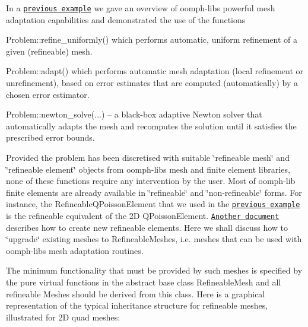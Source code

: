In a \href{../../../poisson/fish_poisson/html/index.html}{\tt previous example} we gave an overview of {\ttfamily oomph-\/lib\textquotesingle{}s} powerful mesh adaptation capabilities and demonstrated the use of the functions
\begin{DoxyItemize}
\item {\ttfamily Problem\+::refine\+\_\+uniformly()} which performs automatic, uniform refinement of a given (refineable) mesh.
\item {\ttfamily Problem\+::adapt()} which performs automatic mesh adaptation (local refinement or unrefinement), based on error estimates that are computed (automatically) by a chosen error estimator.
\item {\ttfamily Problem\+::newton\+\_\+solve}(...) -- a black-\/box adaptive Newton solver that automatically adapts the mesh and recomputes the solution until it satisfies the prescribed error bounds.
\end{DoxyItemize}Provided the problem has been discretised with suitable \char`\"{}refineable mesh\char`\"{} and \char`\"{}refineable element\char`\"{} objects from {\ttfamily oomph-\/lib\textquotesingle{}s} mesh and finite element libraries, none of these functions require any intervention by the user. Most of {\ttfamily oomph-\/lib} finite elements are already available in \char`\"{}refineable\char`\"{} and \char`\"{}non-\/refineable\char`\"{} forms. For instance, the {\ttfamily Refineable\+Q\+Poisson\+Element} that we used in the \href{../../../poisson/fish_poisson/html/index.html}{\tt previous example} is the refineable equivalent of the 2D {\ttfamily Q\+Poisson\+Element}. \href{../../../to_be_written/html/index.html}{\tt Another document} describes how to create new refineable elements. Here we shall discuss how to \char`\"{}upgrade\char`\"{} existing meshes to {\ttfamily Refineable\+Meshes}, i.\+e. meshes that can be used with {\ttfamily oomph-\/lib\textquotesingle{}s} mesh adaptation routines.

The minimum functionality that must be provided by such meshes is specified by the pure virtual functions in the abstract base class {\ttfamily Refineable\+Mesh} and all refineable Meshes should be derived from this class. Here is a graphical representation of the typical inheritance structure for refineable meshes, illustrated for 2D quad meshes\+:

